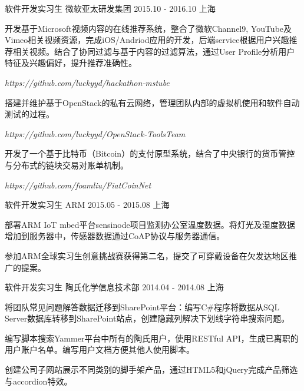 \begin{cventries}
  \cventry
    {软件开发实习生}
    {微软亚太研发集团}
    {2015.10 - 2016.10}
    {上海}
    {
      \begin{cvitems}
        \item {开发基于Microsoft视频内容的在线推荐系统，整合了微软Channel9, YouTube及Vimeo相关视频资源，完成iOS/Andriod应用的开发，后端service根据用户兴趣推荐相关视频。结合了协同过滤与基于内容的过滤算法，通过User Profile分析用户特征及兴趣偏好，提升推荐准确性。}
        \item[] {\color{red} \emph {https://github.com/luckyyd/hackathon-mstube}}
        \item {搭建并维护基于OpenStack的私有云网络，管理团队内部的虚拟机使用和软件自动测试的过程。}
        \item[] {\color{red} \emph {https://github.com/luckyyd/OpenStack-ToolsTeam}}
        \item {开发了一个基于比特币（Bitcoin）的支付原型系统，结合了中央银行的货币管控与分布式的链块交易对账单机制。}
        \item[] {\color{red} \emph {https://github.com/foamliu/FiatCoinNet}}
      \end{cvitems}
    }
  \cventry
    {软件开发实习生}
    {ARM}
    {2015.05 - 2015.08}
    {上海}
    {
      \begin{cvitems}
        \item {部署ARM IoT mbed平台sensinode项目监测办公室温度数据。将灯光及湿度数据增加到服务器中，传感器数据通过CoAP协议与服务器通信。}
        \item {参加ARM全球实习生创意挑战赛获得第二名，提交了可穿戴设备在欠发达地区推广的提案。}
      \end{cvitems}
    }
  \cventry
    {软件开发实习生}
    {陶氏化学信息技术部}
    {2014.04 - 2014.08}
    {上海}
    {
      \begin{cvitems}
        \item {将团队常见问题解答数据迁移到SharePoint平台：编写C\#程序将数据从SQL Server数据库转移到SharePoint站点，创建隐藏列解决下划线字符串搜索问题。}
        \item {编写脚本搜索Yammer平台中所有的陶氏用户，使用RESTful API，生成已离职的用户账户名单。编写用户文档方便其他人使用脚本。}
        \item {创建公司子网站展示不同类别的脚手架产品，通过HTML5和jQuery完成产品筛选与accordion特效。} 
      \end{cvitems} 
    }
\end{cventries}
